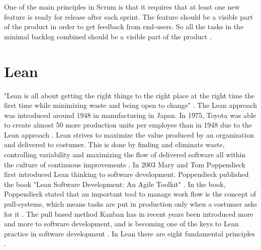 \documentclass[UKenglish]{ifimaster}  %
\begin{document}
One of the main principles in Scrum is that it requires that at least one new feature is ready for release after each sprint. The feature should be a visible part of the product in order to get feedback from end-users. So all the tasks in the minimal backlog combined should be a visible part of the product \parencite{Scrum}.


\section {Lean}
\label{sec:Lean}
"Lean is all about getting the right things to the right place at the right time the first time while minimizing waste and being open to change" \parencite{741480}.
The Lean approach was introduced around 1948 in manufacturing in Japan.  In 1975, Toyota was able to create almost 50 more production units per employee than in 1948 due to the Lean approach \parencite{manning}. Lean strives to maximize the value produced by an organization and delivered to costumer. This is done by finding and eliminate waste, controlling variability and maximizing the flow of delivered software all within the culture of continuous improvements \parencite{DavidAnderson}. In 2003 Mary and Tom Poppendieck first introduced Lean thinking to software development. Poppendieck published the book "Lean Software Development: An Agile Toolkit" \parencite{Lean:2003}. In the book, Poppendieck stated that an important tool to manage work flow is the concept of pull-systems, which means tasks are put in production only when a costumer asks for it \parencite{Lean:2009}.
The pull based method Kanban has in recent years been introduced more and more to software development, and is becoming one of the keys to Lean practice in software development \parencite{DavidAnderson}. In Lean there are eight fundamental principles \parencite{poppendieck2003lean}.
\end{document}
